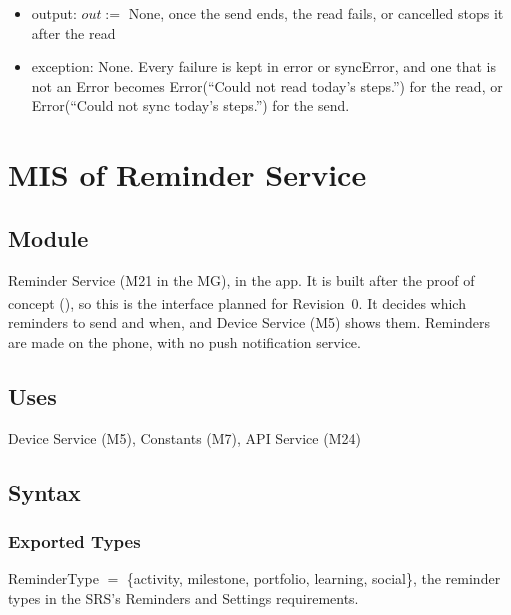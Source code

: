\documentclass[12pt, titlepage]{article}
\begin{document}
\begin{itemize}
\begin{enumerate}
  a later refresh runs and after a failed send, so it is not a lasting record
  of the balance. If the send fails with $e$, syncError $:= e$, and steps
  keeps its count, since the read was right.
  API Service doesn't retry (AC24), so the next refresh sends it again. Either
  way, syncing $:=$ false.
\end{enumerate}
\item output: $out :=$ None, once the send ends, the read fails, or
  cancelled stops it after the read
\item exception: None. Every failure is kept in error or syncError, and one
  that is not an Error becomes Error(``Could not read today's steps.'') for
  the read, or Error(``Could not sync today's steps.'') for the send.
\end{itemize}

\newpage

\section{MIS of Reminder Service} \label{MisReminders}

\begingroup\raggedright
\subsection{Module}

Reminder Service (M21 in the MG), in the app. It is built after the proof of
concept (\textsuperscript{\dag}), so this is the interface planned for
Revision~0. It decides which reminders to send and when, and Device Service
(M5) shows them. Reminders are made on the phone, with no push notification
service.

\subsection{Uses}

Device Service (M5), Constants (M7), API Service (M24)

\subsection{Syntax}

\subsubsection{Exported Types}

\noindent ReminderType $=$ \{activity, milestone, portfolio, learning,
social\}, the reminder types in the SRS's Reminders and Settings requirements.
\end{document}
